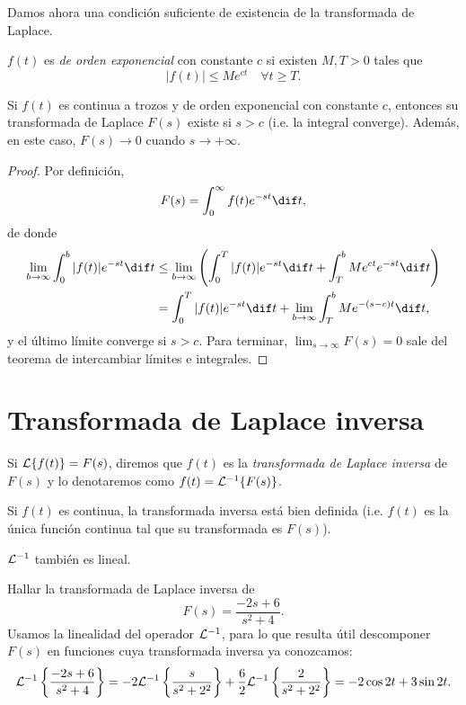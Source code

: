 \documentclass[../main.tex]{subfiles}
\begin{document}
Damos ahora una condición suficiente de existencia de la transformada de Laplace.

\begin{definition}
  \(f(t)\) es \emph{de orden exponencial} con constante \(c\) si existen \(M, T
  > 0\) tales que
  \[|f(t)| \leq Me^{ct} \quad \forall t \geq T.\]
\end{definition}

\begin{theorem}
  Si \(f(t)\) es continua a trozos y de orden exponencial con constante \(c\),
  entonces su transformada de Laplace \(F(s)\) existe si \(s > c\) (i.e. la
  integral converge). Además, en este caso, \(F(s) \to 0\) cuando \(s \to +\infty\).
  \begin{proof}
    Por definición,
    \[F(s) = \int_0^\infty f(t)e^{-st} \dif t,\]
    de donde
    \begin{align*}
      \lim_{b \to \infty} \int_0^b |f(t)|e^{-st} \dif t &\leq \lim_{b \to
        \infty} \left( \int_0^T |f(t)|e^{-st} \dif t + \int_T^b Me^{ct}e^{-st}
        \dif t \right) \\
      &= \int_0^T |f(t)|e^{-st} \dif t + \lim_{b \to \infty} \int_T^b Me^{-(s-c)t} \dif t,
    \end{align*}
    y el último límite converge si \(s>c\). Para terminar, \(\lim_{s \to \infty}
    F(s) = 0\) sale del teorema de intercambiar límites e integrales.
  \end{proof}
\end{theorem}

\section{Transformada de Laplace inversa}
Si \(\mathcal{L}\{f(t)\} = F(s)\), diremos que \(f(t)\) es la \emph{transformada de
  Laplace inversa} de \(F(s)\) y lo denotaremos como \(f(t) = \mathcal{L}^{-1}\{F(s)\}\).

\begin{remark}
  Si \(f(t)\) es continua, la transformada inversa está bien definida
  (i.e. \(f(t)\) es la única función continua tal que su transformada es \(F(s)\)).
\end{remark}

\begin{remark}
  \(\mathcal{L}^{-1}\) también es lineal.
\end{remark}

\begin{example}
  Hallar la transformada de Laplace inversa de
  \[F(s) = \frac{-2s+6}{s^2+4}.\]
  Usamos la linealidad del operador \(\mathcal{L}^{-1}\), para lo que resulta útil
  descomponer \(F(s)\) en funciones cuya transformada inversa ya conozcamos:
  \[\mathcal{L}^{-1}\left\{\frac{-2s+6}{s^2+4}\right\} =
    -2\mathcal{L}^{-1}\left\{\frac{s}{s^2+2^2}\right\} +
    \frac{6}{2}\mathcal{L}^{-1}\left\{\frac{2}{s^2+2^2}\right\} = -2 \cos 2t + 3 \sin 2t.\]
\end{example}
\end{document}
